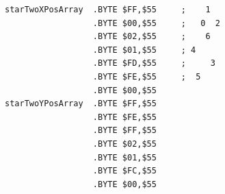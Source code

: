 \begin{minipage}[b]{0.48\linewidth}
\begin{lrbox}{\mybox}%
\begin{lstlisting}[basicstyle=\ttfamily\tiny]
starTwoXPosArray  .BYTE $FF,$55     ;    1  
                  .BYTE $00,$55     ;   0  2
                  .BYTE $02,$55     ;    6  
                  .BYTE $01,$55     ; 4     
                  .BYTE $FD,$55     ;     3 
                  .BYTE $FE,$55     ;  5    
                  .BYTE $00,$55
starTwoYPosArray  .BYTE $FF,$55
                  .BYTE $FE,$55
                  .BYTE $FF,$55
                  .BYTE $02,$55
                  .BYTE $01,$55
                  .BYTE $FC,$55
                  .BYTE $00,$55
\end{lstlisting}
\end{lrbox}%
\scalebox{0.8}{\usebox{\mybox}}

\end{minipage}
